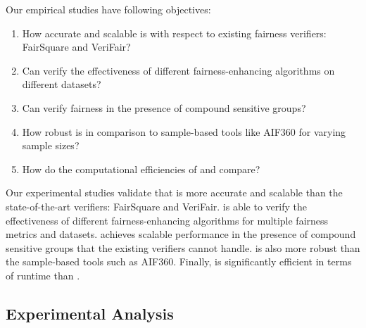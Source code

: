Our empirical studies have following objectives:

\begin{enumerate}
	\item How accurate and scalable {\justicia} is with respect to existing fairness verifiers: FairSquare and VeriFair?
	\item Can {\justicia} verify the effectiveness of different fairness-enhancing algorithms on different datasets?
	\item Can {\justicia} verify fairness in the presence of compound sensitive groups?
	\item How robust is {\justicia} in comparison to sample-based tools like AIF360 for varying sample sizes?
	\item How do the computational efficiencies of {\justicialearn} and {\justiciaenum} compare?
\end{enumerate}



Our experimental studies validate that {\justicia} is more accurate and scalable than the state-of-the-art verifiers: FairSquare and VeriFair. {\justicia} is able to verify the effectiveness of different fairness-enhancing algorithms for multiple fairness metrics and datasets. {\justicia} achieves scalable performance in the presence of compound sensitive groups that the existing verifiers cannot handle.  {\justicia} is also more robust than the sample-based tools such as AIF360.
Finally, {\justicialearn} is significantly efficient in terms of runtime than {\justiciaenum}.


\subsection{Experimental Analysis}



